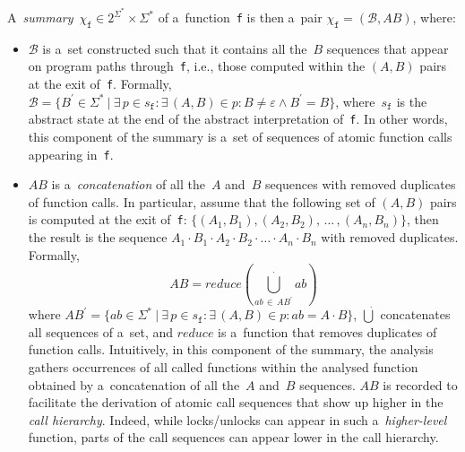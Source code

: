 A~\emph{summary}~$ \chi_\mathtt{f} \in 2^{\Sigma^*} \times \Sigma^* $ of
a~function~\texttt{f} is then a~pair $ \chi_\mathtt{f} = (\mathcal{B},
AB) $, where:
\begin{itemize}
    \item $ \mathcal{B} $ is a~set constructed such that it contains all the~$ B $ sequences that appear on program paths through~\texttt{f}, i.e., those computed within the $ (A, B) $ pairs at the exit of~\texttt{f}. Formally, $ \mathcal{B} = \{B^\prime \in \Sigma^*\ |\ \exists\,p \in s_\mathtt{f} : \exists\,(A, B) \in p : B \neq \varepsilon \wedge B^\prime = B\} $, where~$ s_\mathtt{f} $ is the abstract state at the end of the abstract interpretation of~\texttt{f}. In other words, this component of the summary is a~set of sequences of atomic function calls appearing in~\texttt{f}.

    \item $ AB $ is a~\emph{concatenation} of all the~$ A $ and~$ B $ sequences with removed duplicates of function calls. In particular, assume that the following set of $ (A, B) $ pairs is computed at the exit of~\texttt{f}: $ \{(A_1, B_1), (A_2, B_2),\,\ldots\,, (A_n, B_n)\} $, then the result is the sequence $ A_1 \cdot B_1 \cdot A_2 \cdot B_2 \cdot \ldots \cdot A_n \cdot B_n $ with removed duplicates. Formally,
        $$
            AB = reduce(\bigcup\limits_{ab\,\in\,AB^\prime}^\cdot ab)
        $$
        where $ AB^\prime = \{ab \in \Sigma^*\ |\ \exists\,p \in s_\mathtt{f} : \exists\,(A, B) \in p: ab = A \cdot B\} $, $ \dot\bigcup $ concatenates all sequences of a~set, and $ reduce $ is a~function that removes duplicates of function calls. Intuitively, in this component of the summary, the analysis gathers occurrences of all called functions within the analysed function obtained by a~concatenation of all the~$ A $ and~$ B $ sequences. $ AB $ is recorded to facilitate the derivation of atomic call sequences that show up higher in the \emph{call hierarchy}. Indeed, while locks/unlocks can appear in such a~\emph{higher-level} function, parts of the call sequences can appear lower in the call hierarchy.
\end{itemize}

